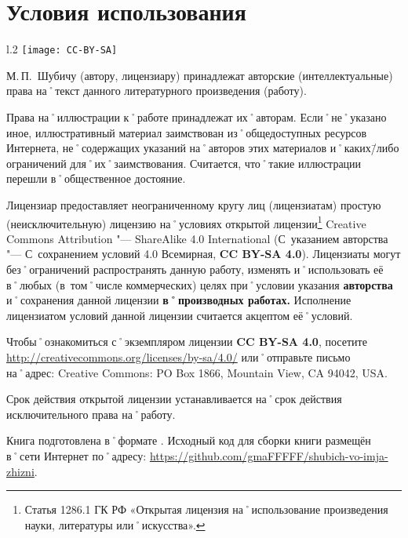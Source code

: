 ﻿%
\chapter{Условия использования}

\begin{wrapfigure}{l}{.2\textwidth}
\centering
\texttt{[image: CC-BY-SA]}
\label{fig:CC-BY-SA}
\end{wrapfigure}

\noindent М.\,П.~Шубичу (автору, лицензиару) принадлежат авторские (интеллектуальные) права на˚текст данного литературного произведения (работу). 

\noindent Права на˚иллюстрации к˚работе принадлежат их˚авторам. Если˚не˚указано иное, иллюстративный материал заимствован из˚общедоступных ресурсов Интернета, не˚содержащих указаний на˚авторов этих материалов и˚каких\=/либо ограничений для˚их˚заимствования. Считается, что˚такие иллюстрации перешли в˚общественное достояние.

Лицензиар предоставляет неограниченному кругу лиц (лицензиатам) простую (неисключительную) лицензию на˚условиях открытой лицензии\footnote
{Статья 1286.1 ГК РФ «Открытая лицензия на˚использование произведения науки, литературы или˚искусства».}
\foreignlanguage{english}{Creative Commons Attribution "--- ShareAlike 4.0 International} (С~указанием авторства "--- С~сохранением условий 4.0 Всемирная, \textbf{CC BY-SA 4.0}). Лицензиаты могут без˚ограничений распространять данную работу, изменять и˚использовать её в˚любых (в~том˚числе коммерческих) целях при˚условии указания \textbf{авторства} и˚сохранения данной лицензии \textbf{в˚производных работах.}
Исполнение лицензиатом условий данной лицензии считается акцептом её˚условий.

Чтобы˚ознакомиться с˚экземпляром лицензии \textbf{CC BY-SA 4.0}, посетите \url{http://creativecommons.org/licenses/by-sa/4.0/} или˚отправьте письмо на˚адрес: \foreignlanguage{english}{Creative Commons: PO Box 1866, Mountain View, CA 94042, USA.}{\sloppy

}%

Срок действия открытой лицензии устанавливается на˚срок действия исключительного права на˚работу.

Книга подготовлена в˚формате \LaTeXe{}. Исходный код для сборки книги размещён в˚сети Интернет по˚адресу: \url{https://github.com/gmaFFFFF/shubich-vo-imja-zhizni}.{\sloppy

}